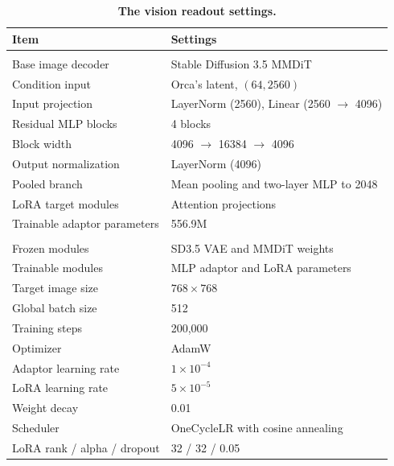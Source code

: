 \begin{table}[!htbp] 
\centering 
\caption{\textbf{The vision readout settings.}} \label{tab:appendix_vision_readout_settings} 
\begin{tabular}{ll} 
\toprule[1pt]
\textbf{Item} & \textbf{Settings} \\ 
\midrule
\rowcolor[rgb]{ .949, .949, .949} \multicolumn{2}{l}{\textit{Architecture}} \\
Base image decoder & Stable Diffusion 3.5 MMDiT \\ 
Condition input & Orca's latent, \((64, 2560)\) \\ 
Input projection & LayerNorm (2560), Linear (2560 \(\rightarrow\) 4096) \\
Residual MLP blocks & 4 blocks \\ 
Block width & 4096 \(\rightarrow\) 16384 \(\rightarrow\) 4096 \\ 
Output normalization & LayerNorm (4096) \\ 
Pooled branch & Mean pooling and two-layer MLP to 2048 \\ 
LoRA target modules & Attention projections \\ 
Trainable adaptor parameters & 556.9M \\ 
\midrule \rowcolor[rgb]{ .949, .949, .949} \multicolumn{2}{l}{\textit{Training}} \\ 
Frozen modules & SD3.5 VAE and MMDiT weights \\ 
Trainable modules & MLP adaptor and LoRA parameters \\ 
Target image size & \(768 \times 768\) \\ 
Global batch size & 512 \\ 
Training steps & 200,000 \\ 
Optimizer & AdamW \\ 
Adaptor learning rate & \(1 \times 10^{-4}\) \\ 
LoRA learning rate & \(5 \times 10^{-5}\) \\ 
Weight decay & 0.01 \\ 
Scheduler & OneCycleLR with cosine annealing \\ 
LoRA rank / alpha / dropout & 32 / 32 / 0.05 \\ 
\bottomrule[1pt] 
\end{tabular} 
\end{table}







